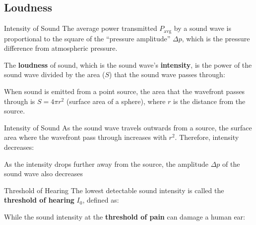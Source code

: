 \documentclass[12pt,compress,aspectratio=169]{beamer}
\begin{document}



\subsection{Loudness}

\begin{frame}{Intensity of Sound}
  The average power transmitted $P_\text{avg}$ by a sound wave is proportional
  to the square of the ``pressure amplitude'' $\Delta p$, which is the pressure
  difference from atmospheric pressure.


  \vspace{-.2in}The \textbf{loudness} of sound, which is the sound wave's
  \textbf{intensity}, is the power of the sound wave divided by the area ($S$)
  that the sound wave passes through:

  
  \vspace{-.05in}When sound is emitted from a point source, the area that the
  wavefront passes through is $S=4\pi r^2$ (surface area of a sphere), where
  $r$ is the distance from the source.
\end{frame}



\begin{frame}{Intensity of Sound}
  As the sound wave travels outwards from a source, the surface area where the
  wavefront pass through increases with $r^2$. Therefore, intensity decreases:

  \begin{center}
  \end{center}
  As the intensity drops further away from the source, the amplitude $\Delta p$
  of the sound wave also decreases
\end{frame}



\begin{frame}{Threshold of Hearing}
  The lowest detectable sound intensity is called the \textbf{threshold of
    hearing} $I_0$, defined as:

  
  While the sound intensity at the \textbf{threshold of pain} can damage a
  human ear:

\end{frame}
\end{document}
